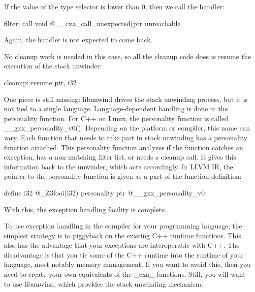 If the value of the type selector is lower than 0, then we call the handler:

\begin{shell}
filter:
call void @__cxa_call_unexpected(ptr %
unreachable
\end{shell}

Again, the handler is not expected to come back.

No cleanup work is needed in this case, so all the cleanup code does is resume the execution of the stack unwinder:

\begin{shell}
cleanup:
resume { ptr, i32 } %
\end{shell}

One piece is still missing: libunwind drives the stack unwinding process, but it is not tied to a single language. Language-dependent handling is done in the personality function. For C++ on Linux, the personality function is called \_\_gxx\_personality\_v0(). Depending on the platform or compiler, this name can vary. Each function that needs to take part in stack unwinding has a personality function attached. This personality function analyzes if the function catches an exception, has a non-matching filter list, or needs a cleanup call. It gives this information back to the unwinder, which acts accordingly. In LLVM IR, the pointer to the personality function is given as a part of the function definition:

\begin{shell}
define i32 @_Z3fooi(i32) personality ptr @__gxx_personality_v0
\end{shell}

With this, the exception handling facility is complete.

To use exception handling in the compiler for your programming language, the simplest strategy is to piggyback on the existing C++ runtime functions. This also has the advantage that your exceptions are interoperable with C++. The disadvantage is that you tie some of the C++ runtime into the runtime of your language, most notably memory management. If you want to avoid this, then you need to create your own equivalents of the \_cxa\_ functions. Still, you will want to use libunwind, which provides the stack unwinding mechanism:

